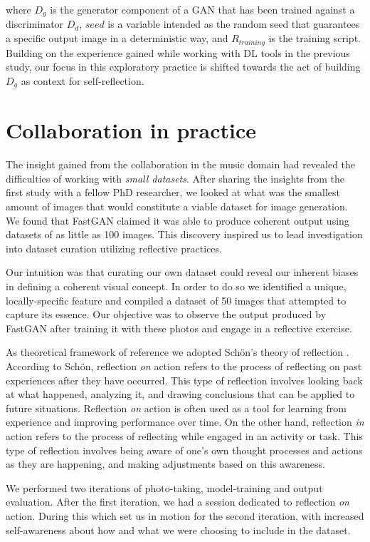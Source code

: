 where $D_g$ is the generator component of a GAN that has been trained against a discriminator $D_d$, $seed$ is a variable intended as the random seed that guarantees a specific output image in a deterministic way, and $R_{training}$ is the training script. Building on the experience gained while working with DL tools in the previous study, our focus in this exploratory practice is shifted towards the act of building $D_g$ as context for self-reflection.

\section{Collaboration in practice}
The insight gained from the collaboration in the music domain had revealed the difficulties of working with \emph{small datasets}. After sharing the insights from the first study with a fellow PhD researcher, we looked at what was the smallest amount of images that would constitute a viable dataset for image generation. We found that FastGAN \citep{Liu2021} claimed it was able to produce coherent output using datasets of as little as 100 images. This discovery inspired us to lead investigation into dataset curation utilizing reflective practices.

Our intuition was that curating our own dataset could reveal our inherent biases in defining a coherent visual concept. In order to do so we identified a unique, locally-specific feature and compiled a dataset of 50 images that attempted to capture its essence. Our objective was to observe the output produced by FastGAN after training it with these photos and engage in a reflective exercise.

As theoretical framework of reference we adopted Schön's theory of reflection \citep{Schoen1991}. According to Schön, reflection \textit{on} action refers to the process of reflecting on past experiences after they have occurred. This type of reflection involves looking back at what happened, analyzing it, and drawing conclusions that can be applied to future situations. Reflection \emph{on} action is often used as a tool for learning from experience and improving performance over time. On the other hand, reflection \textit{in} action refers to the process of reflecting while engaged in an activity or task. This type of reflection involves being aware of one's own thought processes and actions as they are happening, and making adjustments based on this awareness.

We performed two iterations of photo-taking, model-training and output evaluation. After the first iteration, we had a session dedicated to reflection \textit{on} action. During this which set us in motion for the second iteration, with increased self-awareness about how and what we were choosing to include in the dataset.

